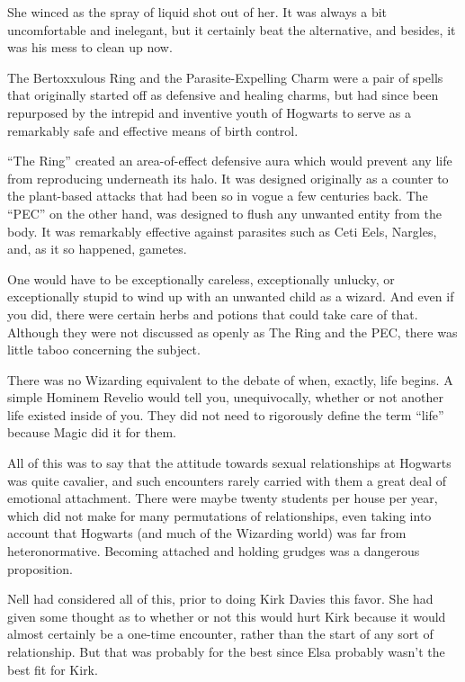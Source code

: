 She winced as the spray of liquid shot out of her. It was always a bit uncomfortable and inelegant, but it certainly beat the alternative, and besides, it was his mess to clean up now.

The Bertoxxulous Ring and the Parasite-Expelling Charm were a pair of spells that originally started off as defensive and healing charms, but had since been repurposed by the intrepid and inventive youth of Hogwarts to serve as a remarkably safe and effective means of birth control.

“The Ring” created an area-of-effect defensive aura which would prevent any life from reproducing underneath its halo. It was designed originally as a counter to the plant-based attacks that had been so in vogue a few centuries back. The “PEC” on the other hand, was designed to flush any unwanted entity from the body. It was remarkably effective against parasites such as Ceti Eels, Nargles, and, as it so happened, gametes.

One would have to be exceptionally careless, exceptionally unlucky, or exceptionally stupid to wind up with an unwanted child as a wizard. And even if you did, there were certain herbs and potions that could take care of that. Although they were not discussed as openly as The Ring and the PEC, there was little taboo concerning the subject.

There was no Wizarding equivalent to the debate of when, exactly, life begins. A simple Hominem Revelio would tell you, unequivocally, whether or not another life existed inside of you. They did not need to rigorously define the term “life” because Magic did it for them.

All of this was to say that the attitude towards sexual relationships at Hogwarts was quite cavalier, and such encounters rarely carried with them a great deal of emotional attachment. There were maybe twenty students per house per year, which did not make for many permutations of relationships, even taking into account that Hogwarts (and much of the Wizarding world) was far from heteronormative. Becoming attached and holding grudges was a dangerous proposition.

Nell had considered all of this, prior to doing Kirk Davies this favor. She had given some thought as to whether or not this would hurt Kirk because it would almost certainly be a one-time encounter, rather than the start of any sort of relationship. But that was probably for the best since Elsa probably wasn’t the best fit for Kirk.

